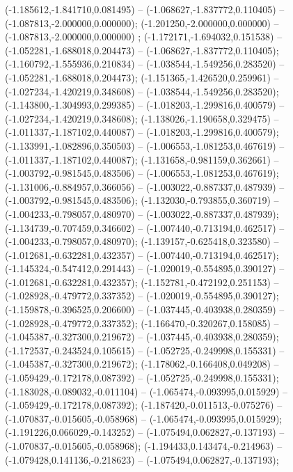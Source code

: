  (-1.185612,-1.841710,0.081495) -- (-1.068627,-1.837772,0.110405) -- (-1.087813,-2.000000,0.000000);
 (-1.201250,-2.000000,0.000000) -- (-1.087813,-2.000000,0.000000) ;
 (-1.172171,-1.694032,0.151538) -- (-1.052281,-1.688018,0.204473) -- (-1.068627,-1.837772,0.110405);
 (-1.160792,-1.555936,0.210834) -- (-1.038544,-1.549256,0.283520) -- (-1.052281,-1.688018,0.204473);
 (-1.151365,-1.426520,0.259961) -- (-1.027234,-1.420219,0.348608) -- (-1.038544,-1.549256,0.283520);
 (-1.143800,-1.304993,0.299385) -- (-1.018203,-1.299816,0.400579) -- (-1.027234,-1.420219,0.348608);
 (-1.138026,-1.190658,0.329475) -- (-1.011337,-1.187102,0.440087) -- (-1.018203,-1.299816,0.400579);
 (-1.133991,-1.082896,0.350503) -- (-1.006553,-1.081253,0.467619) -- (-1.011337,-1.187102,0.440087);
 (-1.131658,-0.981159,0.362661) -- (-1.003792,-0.981545,0.483506) -- (-1.006553,-1.081253,0.467619);
 (-1.131006,-0.884957,0.366056) -- (-1.003022,-0.887337,0.487939) -- (-1.003792,-0.981545,0.483506);
 (-1.132030,-0.793855,0.360719) -- (-1.004233,-0.798057,0.480970) -- (-1.003022,-0.887337,0.487939);
 (-1.134739,-0.707459,0.346602) -- (-1.007440,-0.713194,0.462517) -- (-1.004233,-0.798057,0.480970);
 (-1.139157,-0.625418,0.323580) -- (-1.012681,-0.632281,0.432357) -- (-1.007440,-0.713194,0.462517);
 (-1.145324,-0.547412,0.291443) -- (-1.020019,-0.554895,0.390127) -- (-1.012681,-0.632281,0.432357);
 (-1.152781,-0.472192,0.251153) -- (-1.028928,-0.479772,0.337352) -- (-1.020019,-0.554895,0.390127);
 (-1.159878,-0.396525,0.206600) -- (-1.037445,-0.403938,0.280359) -- (-1.028928,-0.479772,0.337352);
 (-1.166470,-0.320267,0.158085) -- (-1.045387,-0.327300,0.219672) -- (-1.037445,-0.403938,0.280359);
 (-1.172537,-0.243524,0.105615) -- (-1.052725,-0.249998,0.155331) -- (-1.045387,-0.327300,0.219672);
 (-1.178062,-0.166408,0.049208) -- (-1.059429,-0.172178,0.087392) -- (-1.052725,-0.249998,0.155331);
 (-1.183028,-0.089032,-0.011104) -- (-1.065474,-0.093995,0.015929) -- (-1.059429,-0.172178,0.087392);
 (-1.187420,-0.011513,-0.075276) -- (-1.070837,-0.015605,-0.058968) -- (-1.065474,-0.093995,0.015929);
 (-1.191226,0.066029,-0.143252) -- (-1.075494,0.062827,-0.137193) -- (-1.070837,-0.015605,-0.058968);
 (-1.194433,0.143474,-0.214963) -- (-1.079428,0.141136,-0.218623) -- (-1.075494,0.062827,-0.137193);
